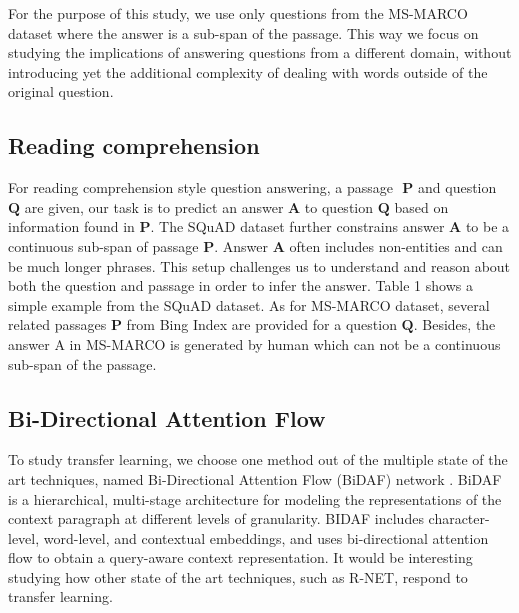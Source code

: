 \documentclass[11pt,a4paper]{article}
\begin{document}
For the purpose of this study, we use only questions from the MS-MARCO dataset where the answer is a sub-span of the passage. This way we focus on studying the implications of answering questions from a different domain, without introducing yet the additional complexity of dealing with words outside of the original question.

\subsection{Reading comprehension}
\label{ssec:reading_comprehension}

For reading comprehension style question answering, a passage $\textbf{ P}$ and question $\textbf{Q}$ are given, our task is to predict an answer $\textbf{A}$ to question $\textbf{Q}$ based on information found in $\textbf{P}$. The SQuAD dataset further constrains answer$\textbf{ A}$ to be a continuous sub-span of passage $\textbf{P}$. Answer$\textbf{ A}$ often includes non-entities and can be much longer phrases. This setup challenges us to understand and reason about both the question and passage in order to infer the answer. Table 1 shows a simple example from the SQuAD dataset. As for MS-MARCO dataset, several related passages $\textbf{P}$ from Bing Index are provided for a question $\textbf{Q}$. Besides, the answer A in MS-MARCO is generated by human which can not be a continuous sub-span of the passage. 

\subsection{Bi-Directional Attention Flow}
\label{ssec:bidaf}

To study transfer learning, we choose one method out of the multiple state of the art techniques, named Bi-Directional Attention Flow (BiDAF) network  \cite{bidaf:2017}. BiDAF is a hierarchical, multi-stage architecture for modeling the representations of the context paragraph at different levels of granularity. BIDAF includes character-level, word-level, and contextual embeddings, and uses bi-directional attention flow to obtain a query-aware context representation. It would be interesting studying how other state of the art techniques, such as R-NET, respond to transfer learning.
\end{document}
